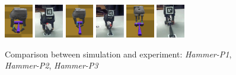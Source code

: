 \begin{figure}[!!hbt]
\begin{center}
{\includegraphics[width=0.11\textwidth]     {images/ssoch/fig/hammer_P1}\label{hammer_P1}}%
{\includegraphics[width=0.11\textwidth]     {images/ssoch/fig/hammer_p1_1}\label{hammer_p1_1}}
{\includegraphics[width=0.11\textwidth]     {images/ssoch/fig/hammer_P2}\label{hammer_P2}}%
{\includegraphics[width=0.11\textwidth]     {images/ssoch/fig/hammer_p2_1}\label{hammer_p2_1}}
{\includegraphics[width=0.11\textwidth]     {images/ssoch/fig/hammer_P3}\label{hammer_P3}}%
{\includegraphics[width=0.11\textwidth]     {images/ssoch/fig/hammer_p3_1}\label{hammer_p3_1}}
        \caption{Comparison between simulation and experiment: \emph{Hammer-P1}, \emph{Hammer-P2}, \emph{Hammer-P3}}
        \label{hammer}
        \end{center}
\end{figure}


